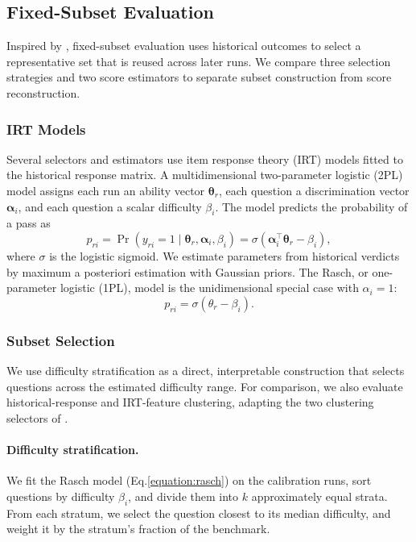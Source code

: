 \subsection{Fixed-Subset Evaluation}
\label{sec:method-fixed}

Inspired by \citet{maiapolo2024tinybenchmarks},
fixed-subset evaluation uses historical outcomes to select a representative set
that is reused across later runs. We compare three selection strategies and two
score estimators to separate subset construction from score reconstruction.

\subsubsection{IRT Models}
Several selectors and estimators use item response theory (IRT) models fitted to
the historical response matrix. A multidimensional two-parameter logistic (2PL)
model assigns each run an ability vector $\boldsymbol{\theta}_r$, each question
a discrimination vector $\boldsymbol{\alpha}_i$, and each question a scalar
difficulty $\beta_i$. The model predicts the probability of a pass as
\begin{equation}
  p_{ri}
  = \Pr(y_{ri}=1\mid\boldsymbol{\theta}_r,
                  \boldsymbol{\alpha}_i,\beta_i)
  = \sigma(\boldsymbol{\alpha}_i^\top\boldsymbol{\theta}_r-\beta_i),
\end{equation}
where $\sigma$ is the logistic sigmoid. We estimate parameters from historical
verdicts by maximum a posteriori estimation with Gaussian priors. The Rasch, or
one-parameter logistic (1PL), model is the unidimensional special case with
$\alpha_i=1$:
\begin{equation}\label{equation:rasch}
  p_{ri}=\sigma(\theta_r-\beta_i).
\end{equation}

\subsubsection{Subset Selection}
We use difficulty stratification as a direct, interpretable construction that selects questions across the estimated difficulty range. For comparison, we also evaluate
historical-response and IRT-feature clustering, adapting the two clustering selectors of
\citet{maiapolo2024tinybenchmarks}.


\paragraph{Difficulty stratification.}
We fit the Rasch model (Eq.\ref{equation:rasch}) on the calibration runs, sort questions by difficulty $\beta_i$,
and divide them into $k$ approximately equal strata. From each
stratum, we select the question closest to its median difficulty, and weight it by the stratum's fraction of the
benchmark.


